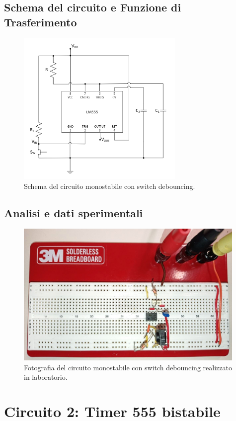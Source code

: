 \documentclass{report}
\begin{document}
\subsection{Schema del circuito e Funzione di Trasferimento}
\begin{figure}[h!]
	\centering
	\includegraphics[height=7.5cm]{immagini/schema1}
	\caption{Schema del circuito monostabile con switch debouncing.}
	\label{figura:schema1}
\end{figure}
\subsection{Analisi e dati sperimentali}
\begin{figure}[h!]
	\centering
	\includegraphics[height=7cm]{immagini/circuito1}
	\caption{Fotografia del circuito monostabile con switch debouncing realizzato in laboratorio.}
	\label{figura:circuito1}
\end{figure}
\newpage
\section{Circuito 2: Timer 555 bistabile}
\end{document}
